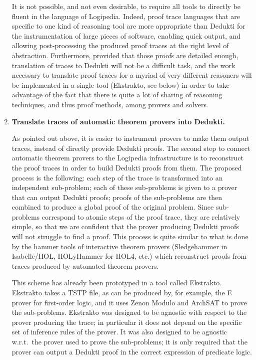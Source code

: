 \begin{enumerate}[\bf(a)]
It is not possible, and not even desirable, to require all tools to
directly be fluent in the language of Logipedia.  Indeed, proof trace
languages that are specific to one kind of reasoning tool are more
appropriate than Dedukti for the instrumentation of large pieces of
software, enabling quick output, and allowing post-processing the
produced proof traces at the right level of abstraction.
Furthermore, provided that those proofs are detailed enough,
translation of traces to Dedukti will not be a difficult task, and
the work necessary to translate proof traces for a myriad of very
different reasoners will be implemented in a single tool (Ekstrakto,
see below) in order to take advantage of the fact that there is quite a lot of
sharing of reasoning techniques, and thus proof methods, among
provers and solvers.

\item{\bf Translate traces of automatic theorem provers into Dedukti.}
  
As pointed out above, it is easier to instrument
provers to make them output traces, instead of directly provide
Dedukti proofs. The second step to connect automatic theorem provers
to the Logipedia infrastructure is to reconstruct the proof traces in
order to build Dedukti proofs from them. The proposed process is the
following: each step of the trace is transformed into an independent
sub-problem; each of these sub-problems is given to a prover that can
output Dedukti proofs; proofs of the sub-problems are then combined to
produce a global proof of the original problem.  Since sub-problems
correspond to atomic steps of the proof trace, they are relatively
simple, so that we are confident that the prover producing Dedukti
proofs will not struggle to find a proof. This process is quite
similar to what is done by the hammer tools of interactive theorem
provers (Sledgehammer in Isabelle/HOL, HOLyHammer for HOL4, etc.)
which reconstruct proofs from traces produced by automated theorem
provers.

This scheme has already been prototyped in a tool called
Ekstrakto. Ekstrakto takes a TSTP file, as can be produced by,
for example, the E prover for first-order logic, and it uses Zenon Modulo and
ArchSAT to prove the sub-problems. Ekstrakto was designed to be
agnostic with respect to the prover producing the trace; in particular
it does not depend on the specific set of inference rules of the
prover. It was also designed to be agnostic w.r.t.\ the prover used to
prove the sub-problems; it is only required that the prover can output
a Dedukti proof in the correct expression of predicate logic.


\end{enumerate}
